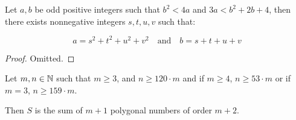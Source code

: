 \begin{lemma}
    \label{lem:CauchyLemma}
    \leanok

    Let $a,b$ be odd positive integers such that $b^2<4a$ and $3a<b^2+2b+4$, then there exists nonnegative integers $s,t,u,v$ such that:

    \[
        a=s^2+t^2+u^2+v^2 \quad \text{and} \quad b=s+t+u+v
    \]
\end{lemma}

\begin{proof}
    Omitted.
\end{proof}


%
%
\begin{theorem}
    \label{thm:CauchyPolygonalNumberTheorem}
    \leanok

    Let $m,n\in\mathbb{N}$ such that $m \geq 3$, and $n \geq 120\cdot m$ and if $m\geq 4$, $n \geq 53\cdot m$ or if $m = 3$, $n \geq 159\cdot m$. 
    
    Then $S$ is the sum of $m+1$ polygonal numbers of order $m + 2$.
\end{theorem}
